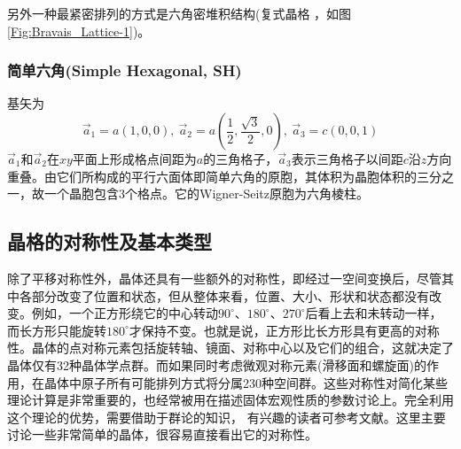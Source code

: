 另外一种最紧密排列的方式是六角密堆积结构(复式晶格 ，如图\ref{Fig:Bravais_Lattice-1})。

\subsubsection{简单六角(Simple Hexagonal, SH)}
基矢为
\begin{displaymath}
	\vec a_1=a(1,0,0),~\vec a_2=a(\frac12,\frac{\sqrt3}2,0),~\vec a_3=c(0,0,1)
\end{displaymath} 
$\vec a_1$和$\vec a_2$在$xy$平面上形成格点间距为$a$的三角格子，$\vec a_3$表示三角格子以间距$c$沿$z$方向重叠。由它们所构成的平行六面体即简单六角的原胞，其体积为晶胞体积的三分之一，故一个晶胞包含3个格点。它的Wigner-Seitz原胞为六角棱柱。

\subsection{晶格的对称性及基本类型} 
除了平移对称性外，晶体还具有一些额外的对称性，即经过一空间变换后，尽管其中各部分改变了位置和状态，但从整体来看，位置、大小、形状和状态都没有改变。例如，一个正方形绕它的中心转动$90^{\circ}$、$180^{\circ}$、$270^{\circ}$后看上去和未转动一样，而长方形只能旋转$180^{\circ}$才保持不变。也就是说，正方形比长方形具有更高的对称性。晶体的点对称元素包括旋转轴、镜面、对称中心以及它们的组合，这就决定了晶体仅有32种晶体学点群。而如果同时考虑微观对称元素(滑移面和螺旋面)的作用，在晶体中原子所有可能排列方式将分属230种空间群。这些对称性对简化某些理论计算是非常重要的，也经常被用在描述固体宏观性质的参数讨论上。完全利用这个理论的优势，需要借助于群论的知识，%
有兴趣的读者可参考文献。这里主要讨论一些非常简单的晶体，很容易直接看出它的对称性。

